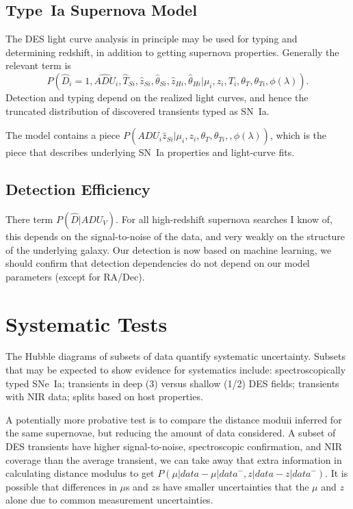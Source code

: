 \documentclass[preprint]{aastex}
\begin{document}
\subsection{Type~Ia Supernova Model}
\label{snmodel:sec}
The DES light curve analysis in principle may be used for typing and determining
redshift, in addition to getting supernova properties.   
Generally the relevant term is
\begin{equation}
P(\hat{D}_i=1,\hat{\mathit{ADU}}_{i}, \hat{T}_{Si}, \hat{z}_{Si}, \hat{\theta}_{Si}, \hat{z}_{Hi}, \hat{\theta}_{Hi}
 | \mu_i,z_i,T_i,\theta_T,\theta_{Ti},\phi(\lambda)).
 \end{equation}
Detection and typing depend on the realized light curves, and hence the truncated
distribution of discovered transients typed as SN~Ia.

The model contains a piece $P(\hat{\mathit{ADU}}_{i} \hat{z}_{Si}| \mu_i,z_i,\theta_T, \theta_{Ti}, ,\phi(\lambda))$, which
is the piece that describes underlying SN~Ia properties and light-curve fits.


\subsection{Detection Efficiency}
There term $P(\hat{D}|\mathit{ADU}_V)$.  For all high-redshift supernova searches
I know of, this depends on the signal-to-noise of the data, and very weakly on the
structure of the underlying galaxy.  Our detection is now based on machine learning,
we should confirm that detection dependencies do not depend on our model parameters
(except for RA/Dec).

\section{Systematic Tests}
\label{systematics:sec}
The Hubble diagrams of subsets of data quantify systematic uncertainty.  
Subsets that may be expected to show evidence for systematics include:
spectroscopically typed SNe~Ia; transients in deep (3) versus shallow (1/2) DES fields;
transients with NIR data; splits based on host properties.

A potentially more probative test is to compare the distance moduii inferred for the same
supernovae, but reducing the amount of data considered.  A subset of DES
transients have higher signal-to-noise, spectroscopic confirmation, and NIR coverage than
the average transient, we can take away that extra information in calculating distance modulus
to get $P(\mu | \mathit{data} - \mu | \mathit{data}^-, z | \mathit{data} - z | \mathit{data}^-)$.
It is possible that differences in $\mu$s and $z$s have smaller uncertainties that the
$\mu$ and $z$ alone due to common measurement uncertainties. 


\end{document}
